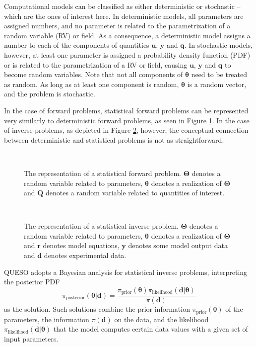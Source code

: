Computational models can be classified as either deterministic or stochastic -- which are the ones of interest here.  In deterministic models, all parameters are assigned numbers, and no parameter is related to the parametrization of a random variable (RV) or field. As a
consequence, a deterministic model assigns a number to each of the components of quantities $\mathbf{u}$, $\mathbf{y}$ and $\mathbf{q}$. In stochastic models, however, at least one parameter is assigned a probability density function (PDF) or is related to the parametrization of a RV or field, causing $\mathbf{u}$, $\mathbf{y}$ and $\mathbf{q}$ to become random variables.  Note that not all components of $\boldsymbol{\theta}$ need to be treated as random. As long as at least one component is random, $\boldsymbol{\theta}$ is a random vector, and the problem is stochastic.



In the case of forward problems, statistical forward problems can be represented very similarly to deterministic forward problems,
as seen in Figure \ref{fig-sfp-queso}.
In the case of inverse problems, as depicted in Figure \ref{fig-sip-queso}, however, the conceptual connection between deterministic and statistical problems
is not as straightforward.

\begin{figure}[h!]
\centerline{
\\
}
\caption{
The representation of a statistical forward problem.
$\boldsymbol{\Theta}$ denotes a random variable related to parameters,
$\boldsymbol{\theta}$ denotes a realization of $\boldsymbol{\Theta}$ and
$\mathbf{Q}$ denotes a random variable related to quantities of interest.
}
\label{fig-sfp-queso}
\end{figure}

\begin{figure}[h!]
\centerline{
\\
}
\caption{
The representation of a statistical inverse problem.
$\boldsymbol{\Theta}$ denotes a random variable related to parameters,
$\boldsymbol{\theta}$ denotes a realization of $\boldsymbol{\Theta}$ and
$\mathbf{r}$ denotes model equations,
$\mathbf{y}$ denotes some model output data and
$\mathbf{d}$ denotes experimental data.
}
\label{fig-sip-queso}
\end{figure}


QUESO adopts a Bayesian analysis \cite{KaSo05, Ro04} for statistical inverse problems, interpreting the posterior PDF
\begin{equation}\label{eq-Bayes-solution}
\pi_{\text{posterior}}(\boldsymbol{\theta}|\mathbf{d})=\frac{\pi_{\text{prior}}(\boldsymbol{\theta})\pi_{\text{likelihood}}(\mathbf{d}|\boldsymbol{\theta})}{\pi(\mathbf{d})}
\end{equation}
as the solution. Such solutions combine the prior information $\pi_{\text{prior}}(\boldsymbol{\theta})$ of the parameters,
the information $\pi(\mathbf{d})$ on the data, and the likelihood $\pi_{\text{likelihood}}(\mathbf{d}|\boldsymbol{\theta})$ that the model computes certain data values with a given set of input parameters.

